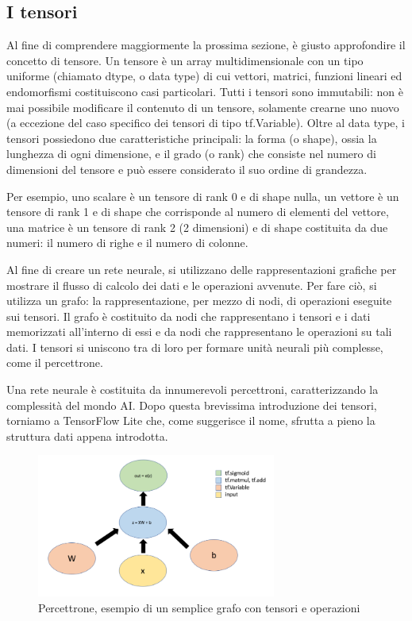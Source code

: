 \subsection{I tensori}
Al fine di comprendere maggiormente la prossima sezione, è giusto approfondire il concetto di tensore. Un tensore è un array multidimensionale con un tipo uniforme (chiamato dtype, o data type) di cui vettori, matrici, funzioni
lineari ed endomorfismi costituiscono casi particolari. Tutti i tensori sono immutabili: non è mai possibile modificare il contenuto di un tensore, solamente crearne uno nuovo (a eccezione del caso specifico dei tensori di tipo tf.Variable).
Oltre al data type, i tensori possiedono due caratteristiche principali: la forma (o shape), ossia la lunghezza di ogni dimensione, e il grado (o rank) che consiste nel numero di dimensioni del tensore e può essere considerato
il suo ordine di grandezza.

Per esempio, uno scalare è un tensore di rank 0 e di shape nulla, un vettore è un tensore di rank 1 e di shape che corrisponde al numero di elementi del vettore, una matrice è un tensore di rank 2 (2 dimensioni) e di shape costituita
da due numeri: il numero di righe e il numero di colonne.

Al fine di creare un rete neurale, si utilizzano delle rappresentazioni grafiche per mostrare il flusso di calcolo dei dati e le operazioni avvenute. Per fare ciò, si utilizza un grafo: la rappresentazione, per mezzo di nodi,
di operazioni eseguite sui tensori. Il grafo è costituito da nodi che rappresentano i tensori e i dati memorizzati all’interno di essi e da nodi che rappresentano le operazioni su tali dati. I tensori si uniscono tra di loro
per formare unità neurali più complesse, come il percettrone.

Una rete neurale è costituita da innumerevoli percettroni, caratterizzando la complessità del mondo AI. Dopo questa brevissima introduzione dei tensori, torniamo a TensorFlow Lite che, come suggerisce il nome, sfrutta a pieno
la struttura dati appena introdotta.

\begin{figure}[ht]
    \centering
    \includegraphics[width=0.7\textwidth]{Immagini/tensore.png}
    \caption{Percettrone, esempio di un semplice grafo con tensori e operazioni}
    \label{fig:tensore}
\end{figure}

